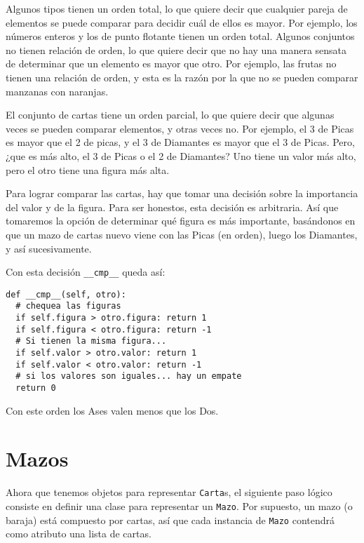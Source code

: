 
Algunos tipos tienen un orden total, lo que quiere decir que cualquier pareja de elementos 
se puede comparar para decidir cuál de ellos es mayor. Por ejemplo, los números enteros y 
los de punto flotante tienen un orden total. Algunos conjuntos no tienen relación de orden, 
lo que quiere decir que no hay una manera sensata de determinar que un elemento es mayor 
que otro. Por ejemplo, las frutas no tienen una relación de orden, y esta es la razón por 
la que no se pueden comparar manzanas con naranjas.

El conjunto de cartas tiene un orden parcial, lo que quiere decir que algunas veces se pueden 
comparar elementos, y otras veces no. Por ejemplo, el 3 de Picas es mayor que el 2 de picas, 
y el 3 de Diamantes es mayor que el 3 de Picas. Pero, ¿que es más alto, el 3 de Picas o el 2 
de Diamantes? Uno tiene un valor más alto, pero el otro tiene una figura más alta.


Para lograr comparar las cartas, hay que tomar una decisión sobre la importancia del valor 
y de la figura. Para ser honestos, esta decisión es arbitraria. Así que tomaremos la opción 
de determinar qué figura es más importante, basándonos en que un mazo de cartas nuevo viene con 
las Picas (en orden), luego los Diamantes, y así sucesivamente.

Con esta decisión  \texttt{\_\_cmp\_\_} queda así:

\beforeverb
\begin{verbatim}
def __cmp__(self, otro):
  # chequea las figuras
  if self.figura > otro.figura: return 1
  if self.figura < otro.figura: return -1
  # Si tienen la misma figura... 
  if self.valor > otro.valor: return 1
  if self.valor < otro.valor: return -1
  # si los valores son iguales... hay un empate
  return 0
\end{verbatim}
\afterverb
%
Con este orden los Ases valen menos que los Dos.

\section{Mazos}

Ahora que tenemos objetos para representar  \texttt{Carta}s, el siguiente paso lógico consiste en definir una clase para representar un \texttt{Mazo}. Por supuesto, un mazo (o baraja) está compuesto por cartas, así que cada instancia
de \texttt{Mazo} contendrá como atributo una lista de cartas.

